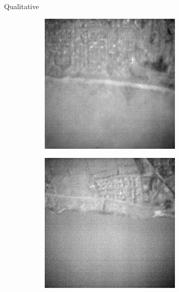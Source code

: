 \begin{frame}{Qualitative}
\begin{figure}
\begin{subfigure}[b]{0.185\textwidth}
            \label{fig:cut}
        \end{subfigure}
        \hspace{0.05em}%
        \begin{subfigure}[b]{0.185\textwidth}
            \centering
            \includegraphics[width=\textwidth]{../figs/outputs/petit/28.png}
            \label{fig:petit}
        \end{subfigure}
        \hspace{0.05em}%
        \begin{subfigure}[b]{0.185\textwidth}
            \centering
            \includegraphics[width=\textwidth]{../figs/outputs/mono/994.png}

\end{subfigure}
\end{figure}
\end{frame}
